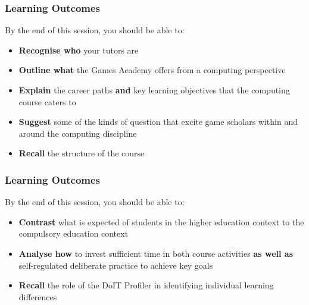 \usepackage{../../beamerthemeFalmouthGamesAcademy}
\usepackage{multimedia}
\graphicspath{ {../../} }


\usepackage[normalem]{ulem}
\usepackage{wasysym}
\usepackage[T1]{fontenc}
\usepackage{pdfpages}

\usetikzlibrary{arrows,automata}







\title{\sessionnumber}
\subtitle{\modulecode: BSc(Hons) Computing for Games}

\frame{\titlepage} 

\begin{frame}
	\frametitle{Learning Outcomes}
	
	By the end of this session, you should be able to:
	
	\begin{itemize}
		\item \textbf{Recognise who} your tutors are
		\item \textbf{Outline what} the Games Academy offers from a computing perspective
		\item \textbf{Explain} the career paths \textbf{and} key learning objectives that the computing course caters to
		\item \textbf{Suggest} some of the kinds of question that excite game scholars within and around the computing discipline
		\item \textbf{Recall} the structure of the course
	\end{itemize}
\end{frame}

\begin{frame}
	\frametitle{Learning Outcomes}
	
	By the end of this session, you should be able to:
	
	\begin{itemize}
		\item \textbf{Contrast} what is expected of students in the higher education context to the compulsory education context
		\item \textbf{Analyse how} to invest sufficient time in both course activities \textbf{as well as} self-regulated deliberate practice to achieve key goals
		\item \textbf{Recall} the role of the DoIT Profiler in identifying individual learning differences
	\end{itemize}
\end{frame}

